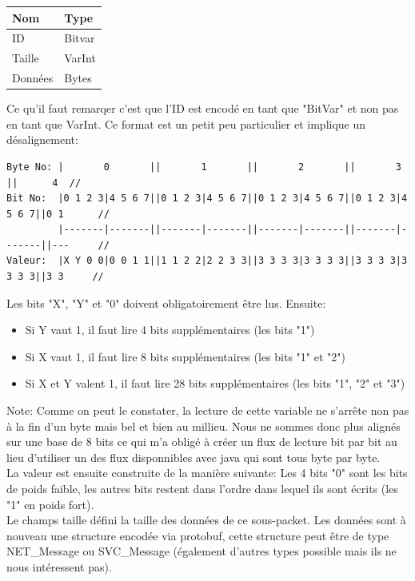 \documentclass{article}
\begin{document}
\begin{center}
	\begin{tabular}{| l | l |}
  	 \hline
  		 Nom & Type \\
  	 \hline
 	  	 ID & Bitvar  \\
  		 Taille & VarInt \\
  		 Données & Bytes \\
   	\hline
	\end{tabular}
\end{center}

Ce qu'il faut remarqer c'est que l'ID est encodé en tant que "BitVar" et non pas en tant que VarInt. Ce format est un petit peu particulier et implique un désalignement:

\begin{verbatim}
Byte No: |       0       ||       1       ||       2       ||       3       ||      4  //
Bit No:  |0 1 2 3|4 5 6 7||0 1 2 3|4 5 6 7||0 1 2 3|4 5 6 7||0 1 2 3|4 5 6 7||0 1      // 
         |-------|-------||-------|-------||-------|-------||-------|-------||---     //
Valeur:  |X Y 0 0|0 0 1 1||1 1 2 2|2 2 3 3||3 3 3 3|3 3 3 3||3 3 3 3|3 3 3 3||3 3     //
\end{verbatim}

Les bits "X", "Y" et "0" doivent obligatoirement être lus. Ensuite: 
\begin{itemize}
\item Si Y vaut 1, il faut lire 4 bits supplémentaires (les bits "1")
\item Si X vaut 1, il faut lire 8 bits supplémentaires (les bits "1" et "2")
\item Si X et Y valent 1, il faut lire 28 bits supplémentaires (les bits "1", "2" et "3")
\end{itemize}
\vspace*{\baselineskip}
Note: Comme on peut le constater, la lecture de cette variable ne s'arrête non pas à la fin d'un byte mais bel et bien au millieu. Nous ne sommes donc plus alignés sur une base de 8 bits ce qui m'a obligé à créer un flux de lecture bit par bit au lieu d'utiliser un des flux disponnibles avec java qui sont tous byte par byte.
\vspace*{\baselineskip}\\
La valeur est ensuite construite de la manière suivante: Les 4 bits "0" sont les bits de poids faible, les autres bits restent dans l'ordre dans lequel ils sont écrits (les "1" en poids fort).\\

Le champs taille défini la taille des données de ce sous-packet. Les données sont à nouveau une structure encodée via protobuf, cette structure peut être de type NET\_Message ou SVC\_Message (également d'autres types possible mais ils ne nous intéressent pas). \\
\end{document}
